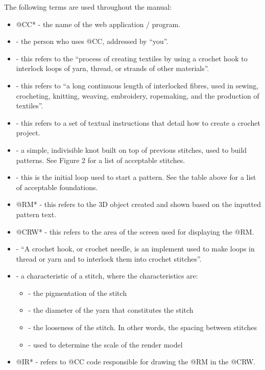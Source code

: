 \documentclass[main.tex]{subfiles}
\begin{document}
The following terms are used throughout the manual:

\begin{itemize}
\item @CC* - the name of the web application / program.
\item {} - the person who uses @CC, addressed by ``you''. 
\item {} - this refers to the ``process of creating textiles by using a crochet hook to interlock loops of yarn, thread, or strands of other materials''.
\item {} - this refers to ``a long continuous length of interlocked fibres, used in sewing, crocheting, knitting, weaving, embroidery, ropemaking, and the production of textiles''.
\item {} - this refers to a set of textual instructions that detail how to create a crochet project. 
\item {} - a simple, indivisible knot built on top of previous stitches, used to build patterns. See Figure 2 for a list of acceptable stitches.
\item {} - this is the initial loop used to start a pattern. See the table above for a list of acceptable foundations.
\item @RM* - this refers to the 3D object created and shown based on the inputted pattern text.
\item @CRW* - this refers to the area of the screen used for displaying the @RM.
\item {} - ``A crochet hook, or crochet needle, is an implement used to make loops in thread or yarn and to interlock them into crochet stitches''.
\item {} - a characteristic of a stitch, where the characteristics are:
    \begin{itemize}\compact
        \item {} - the pigmentation of the stitch
        \item {} - the diameter of the yarn that constitutes the stitch
        \item {} - the looseness of the stitch. In other words, the spacing between stitches
        \item {} - used to determine the scale of the render model
    \end{itemize}
\item @IR* - refers to @CC code responsible for drawing the @RM in the @CRW.

\end{itemize}
\end{document}
